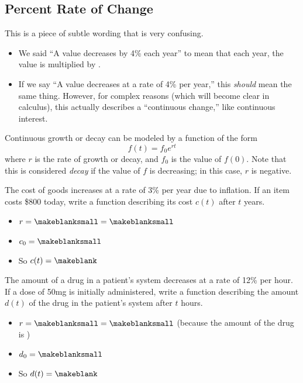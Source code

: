 \subsection{Percent Rate of Change} 
This is a piece of subtle wording that is very confusing.
\begin{itemize}
\item We said ``A value decreases by 4\% each year'' to mean that each year, the value is multiplied by \makeblank.
\item If we say ``A value decreases at a rate of 4\% per year,'' this \emph{should} mean the same thing. However, for complex reasons (which will become clear in calculus), this actually describes a ``continuous change,'' like continuous interest.
\end{itemize}
\begin{displaybox}
Continuous growth or decay can be modeled by a function of the form
\[
f(t)=f_0 e^{rt}
\]
where $r$ is the rate of growth or decay, and $f_0$ is the value of $f(0)$. Note that this is considered \emph{decay} if the value of $f$ is decreasing; in this case, $r$ is negative.
\end{displaybox}
\begin{Example}
The cost of goods increases at a rate of 3\% per year due to inflation. If an item costs \$800 today, write a function describing its cost $c(t)$ after $t$ years.
\begin{itemize}
\item $r=\makeblanksmall=\makeblanksmall$
\item $c_0=\makeblanksmall$
\item So $c(t)=\makeblank$
\end{itemize}
\end{Example}
\begin{Example}
The amount of a drug in a patient's system decreases at a rate of 12\% per hour. If a dose of 50mg is initially administered, write a function describing the amount $d(t)$ of the drug in the patient's system after $t$ hours.
\begin{itemize}
\item $r=\makeblanksmall=\makeblanksmall$ (\makeblank[1in] because the amount of the drug is \makeblank[1in])
\item $d_0=\makeblanksmall$
\item So $d(t)=\makeblank$
\end{itemize}
\end{Example}
